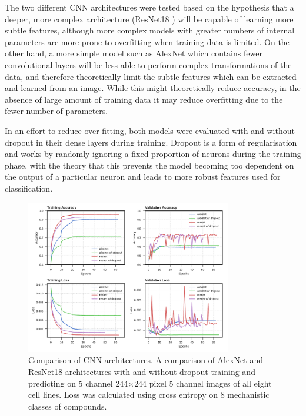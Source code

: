 \documentclass[a4paper,11pt,twoside,openright]{scrbook}
\begin{document}
The two different CNN architectures were tested based on the hypothesis that a deeper, more complex architecture (ResNet18 \cite{He2015}) will be capable of learning more subtle features, although more complex models with greater numbers of internal parameters are more prone to overfitting when training data is limited.
On the other hand, a more simple model such as AlexNet \cite{Krizhevsky2012} which contains fewer convolutional layers will be less able to perform complex transformations of the data, and therefore theoretically limit the subtle features which can be extracted and learned from an image.
While this might theoretically reduce accuracy, in the absence of large amount of training data it may reduce overfitting due to the fewer number of parameters.

In an effort to reduce over-fitting, both models were evaluated with and without dropout in their dense layers during training.
Dropout is a form of regularisation and works by randomly ignoring a fixed proportion of neurons during the training phase, with the theory that this prevents the model becoming too dependent on the output of a particular neuron and leads to more robust features used for classification.

\begin{figure}
    \includegraphics[width=0.8\textwidth]{ch2arch}
    \captionsetup{width=0.8\textwidth}
    \caption[Comparison of CNN architectures]{
Comparison of CNN architectures.
A comparison of AlexNet and ResNet18 architectures with and without dropout training and predicting on 5 channel 244$\times$244 pixel 5 channel images of all eight cell lines.
Loss was calculated using cross entropy on 8 mechanistic classes of compounds.}
    \label{figure:nn_arch}
\end{figure}
\end{document}

